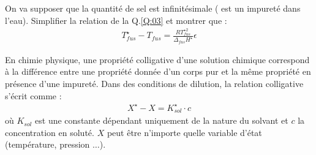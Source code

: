 \Q\label{Q:04} On va supposer que la quantité de sel  est infinitésimale ( est un impureté dans l'eau). Simplifier la relation de la Q.\ref{Q:03} et montrer que : 
\begin{align}
T^\star_{fus} - T_{fus} = \frac{RT^{\star 2}_{fus}}{\Delta_{fus}H^\star} \epsilon
\end{align}

En chimie physique, une propriété colligative d'une solution chimique correspond à la différence entre une propriété donnée d'un corps pur et la même propriété en présence d'une impureté. Dans des conditions de dilution, la relation colligative s'écrit comme : 
\begin{align}
X^\star - X = K^\star_{sol} \cdot c
\label{eq:Xcp-X}
\end{align}
où $K_{sol}$ est une constante dépendant uniquement de la nature du solvant et $c$ la concentration en soluté. $X$ peut être n'importe quelle variable d'état (température, pression $\ldots$).

